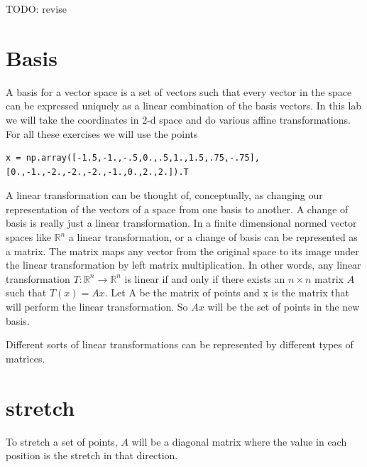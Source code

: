 \label{lab:ChangeBasis}


TODO: revise

\section*{Basis}

A basis for a vector space is a set of vectors such that every vector in the space can be expressed uniquely as a linear combination of the basis vectors.
In this lab we will take the coordinates in 2-d space and do various affine transformations.
For all these exercises we will use the points

\begin{lstlisting}
x = np.array([-1.5,-1.,-.5,0.,.5,1.,1.5,.75,-.75],[0.,-1.,-2.,-2.,-2.,-1.,0.,2.,2.]).T
\end{lstlisting}
A linear transformation can be thought of, conceptually, as changing our representation of the vectors of a space from one basis to another.
A change of basis is really just a linear transformation.
In a finite dimensional normed vector spaces like $\mathbb{R}^n$ a linear transformation, or a change of basis can be represented as a matrix.
The matrix maps any vector from the original space to its image under the linear transformation by left matrix multiplication.
In other words, any linear transformation $T : \mathbb{R}^n \to \mathbb{R}^n$ is linear if and only if there exists an $n\times n$ matrix $A$ such that $T\left(x\right) = A x$.
Let A be the matrix of points and x is the matrix that will perform the linear transformation.
So $A x$ will be the set of points in the new basis.

Different sorts of linear transformations can be represented by different types of matrices.

\section*{stretch}
To stretch a set of points, $A$ will be a diagonal matrix where the value in each position is the stretch in that direction.

